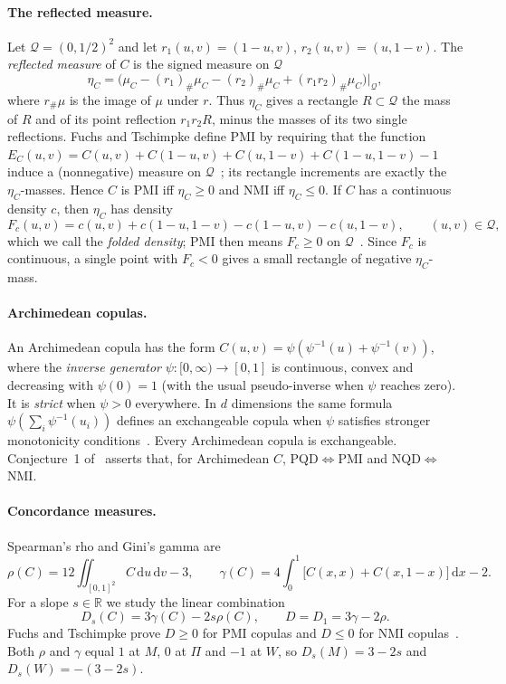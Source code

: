 \documentclass[11pt,a4paper]{article}
\theoremstyle{remark}
\newcommand{\dd}{\,\mathrm d}
\newcommand{\Qq}{\mathcal Q}
\begin{document}
\paragraph{The reflected measure.} Let $\Qq=(0,1/2)^2$ and let $r_1(u,v)=(1-u,v)$, $r_2(u,v)=(u,1-v)$. The \emph{reflected measure} of $C$ is the signed measure on $\Qq$
\[
 \eta_C=\big(\mu_C-(r_1)_\#\mu_C-(r_2)_\#\mu_C+(r_1r_2)_\#\mu_C\big)\big|_{\Qq},
\]
where $r_\#\mu$ is the image of $\mu$ under $r$. Thus $\eta_C$ gives a rectangle $R\subset\Qq$ the mass of $R$ and of its point reflection $r_1r_2R$, minus the masses of its two single reflections. Fuchs and Tschimpke define PMI by requiring that the function $E_C(u,v)=C(u,v)+C(1-u,v)+C(u,1-v)+C(1-u,1-v)-1$ induce a (nonnegative) measure on $\Qq$~\cite[Definition~1 and (2.2)]{FT}; its rectangle increments are exactly the $\eta_C$-masses. Hence $C$ is PMI iff $\eta_C\geq0$ and NMI iff $\eta_C\leq0$. If $C$ has a continuous density $c$, then $\eta_C$ has density
\[
 F_c(u,v)=c(u,v)+c(1-u,1-v)-c(1-u,v)-c(u,1-v),\qquad(u,v)\in\Qq,
\]
which we call the \emph{folded density}; PMI then means $F_c\geq0$ on $\Qq$~\cite[Remark~1]{FT}. Since $F_c$ is continuous, a single point with $F_c<0$ gives a small rectangle of negative $\eta_C$-mass.

\paragraph{Archimedean copulas.} An Archimedean copula has the form $C(u,v)=\psi(\psi^{-1}(u)+\psi^{-1}(v))$, where the \emph{inverse generator} $\psi:[0,\infty)\to[0,1]$ is continuous, convex and decreasing with $\psi(0)=1$ (with the usual pseudo-inverse when $\psi$ reaches zero). It is \emph{strict} when $\psi>0$ everywhere. In $d$ dimensions the same formula $\psi(\sum_i\psi^{-1}(u_i))$ defines an exchangeable copula when $\psi$ satisfies stronger monotonicity conditions~\cite{mcneil}. Every Archimedean copula is exchangeable. Conjecture~1 of~\cite{FT} asserts that, for Archimedean $C$, PQD$\iff$PMI and NQD$\iff$NMI.

\paragraph{Concordance measures.} Spearman's rho and Gini's gamma are
\begin{equation}
 \rho(C)=12\iint_{[0,1]^2}C\dd u\dd v-3,\qquad
 \gamma(C)=4\int_0^1\big[C(x,x)+C(x,1-x)\big]\dd x-2.\label{eq:rhogamma}
\end{equation}
For a slope $s\in\mathbb R$ we study the linear combination
\[
 D_s(C)=3\gamma(C)-2s\rho(C),\qquad D=D_1=3\gamma-2\rho .
\]
Fuchs and Tschimpke prove $D\geq0$ for PMI copulas and $D\leq0$ for NMI copulas~\cite[Corollary~1 and Remark~3]{FT}. Both $\rho$ and $\gamma$ equal $1$ at $M$, $0$ at $\Pi$ and $-1$ at $W$, so $D_s(M)=3-2s$ and $D_s(W)=-(3-2s)$.
\end{document}
